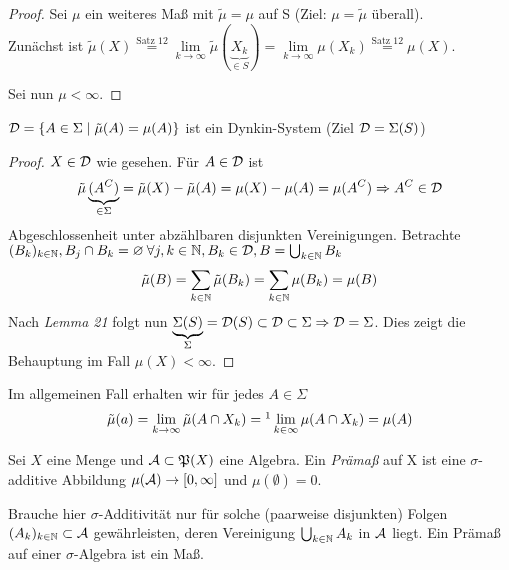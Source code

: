 \documentclass[skript.tex]{subfiles}
\begin{document}
	\begin{proof}
		Sei $\mu$ ein weiteres Maß mit $\tilde{\mu}=\mu$ auf S (Ziel: $\mu=\tilde{\mu}$ überall).\\
		Zunächst ist $\tilde{\mu}(X)\stackrel{\textrm{Satz 12}}=\lim\limits_{k \to \infty}\tilde{\mu}(\underbrace{X_k}_{\in S})=\lim\limits_{k \to \infty}\mu(X_k)\stackrel{\textrm{Satz 12}}=\mu(X)$.
		
		Sei nun $\mu<\infty$.
	\end{proof}

	\begin{beh*}
		$\mathcal{D}=\{A\in \Sigma \mid \tilde{\mu}(A)=\mu(A)\}$ ist ein Dynkin-System (Ziel $\mathcal{D}=\Sigma(S)$)
	\end{beh*}

	\begin{proof}
		$X\in\mathcal{D}$ wie gesehen. Für $A\in\mathcal{D}$ ist
		\begin{equation*}
			\tilde{\mu}\underbrace{(A^C)}_{\in\Sigma}=\tilde{\mu}(X)-\tilde{\mu}(A)=\mu(X)-\mu(A)=\mu(A^C) \Rightarrow A^C\in\mathcal{D}
		\end{equation*}
	Abgeschlossenheit unter abzählbaren disjunkten Vereinigungen.
	Betrachte $(B_k)_{k\in\mathbb{N}},\\ B_j\cap B_k=\varnothing \: \forall j,k \in \mathbb{N}, B_k \in \mathcal{D}, B=\bigcup_{k \in\mathbb{N}} B_k$
	\begin{equation*}
		\tilde{\mu}(B)= \sum_{k\in \mathbb{N}}\tilde{\mu}(B_k)=\sum_{k\in \mathbb{N}}\mu(B_k)=\mu(B)
	\end{equation*}
	Nach \textit{Lemma 21} folgt nun $\underbrace{\Sigma(S)}_{\Sigma}=\mathcal{D}(S) \subset \mathcal{D} \subset \Sigma \Rightarrow \mathcal{D}=\Sigma$. Dies zeigt die Behauptung im Fall $\mu(X)<\infty$.
	\end{proof}

	Im allgemeinen Fall erhalten wir für jedes $A\in\Sigma$
	\begin{equation*}
		\tilde{\mu}(a)=\lim\limits_{k \to \infty}\tilde{\mu}(A \cap X_k)=\footnotemark \lim\limits_{k\in\infty}\mu(A\cap X_k)=\mu(A)
	\end{equation*}

	\begin{defin}[Prämaß]
		Sei $X$ eine Menge und $\mathcal{A} \subset \mathfrak{P}(X)$ eine Algebra. Ein \textit{Prämaß} auf X ist eine $\sigma$-additive Abbildung $\mu(\mathcal{A}) \to [0,\infty]$ und $ \mu(\emptyset)=0$.
	\end{defin}

	\begin{bem*}
		Brauche hier $\sigma$-Additivität nur für solche (paarweise disjunkten) Folgen \\$(A_k)_{k\in\mathbb{N}} \subset \mathcal{A}$ gewährleisten, deren Vereinigung $\bigcup_{k\in\mathbb{N}}A_k$ in $\mathcal{A}$ liegt. Ein Prämaß auf einer $\sigma$-Algebra ist ein Maß.
	\end{bem*}
\end{document}
